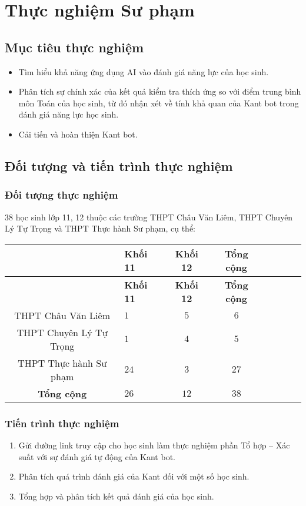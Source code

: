 \chapter{Thực nghiệm Sư phạm}

\section{Mục tiêu thực nghiệm}\begin{itemize}
	\item Tìm hiểu khả năng ứng dụng AI vào đánh giá năng lực của học sinh.
	\item Phân tích sự chính xác của kết quả kiểm tra thích ứng so với điểm trung bình môn Toán của học sinh, từ đó nhận xét về tính khả quan của Kant bot trong đánh giá năng lực học sinh.
	\item Cải tiến và hoàn thiện Kant bot.
\end{itemize}

\section{Đối tượng và tiến trình thực nghiệm}
\subsection{Đối tượng thực nghiệm}
	38 học sinh lớp 11, 12 thuộc các trường THPT Châu Văn Liêm, THPT Chuyên Lý Tự Trọng và THPT Thực hành Sư phạm, cụ thể:
	\begin{longtable}{SlScScSc}
		& \textbf{Khối 11} & \textbf{Khối 12} & \textbf{Tổng cộng} \\ \hline\endfirsthead
		& \textbf{Khối 11} & \textbf{Khối 12} & \textbf{Tổng cộng} \\ \hline\endhead\hline\endfoot
		THPT Châu Văn Liêm & $1$ & $5$ & $6$\\
		THPT Chuyên Lý Tự Trọng & $1$ & $4$ & $5$\\
		THPT Thực hành Sư phạm & $24$ & $3$ & $27$\\\hline
		\textbf{Tổng cộng}     & $26$ & $12$ & $38$\\
	\end{longtable}
\subsection{Tiến trình thực nghiệm}
\begin{enumerate}[label=\textbf{Giai đoạn \arabic*.},align=left,left=0cm..0cm,itemindent=*]
	\item Gửi đường link truy cập cho học sinh làm thực nghiệm phần Tổ hợp – Xác suất với sự đánh giá tự động của Kant bot.\par
	\item Phân tích quá trình đánh giá của Kant đối với một số học sinh.
	\item Tổng hợp và phân tích kết quả đánh giá của học sinh.
\end{enumerate}

